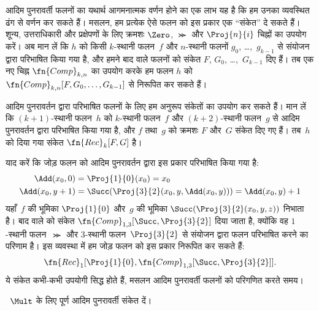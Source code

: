 \documentclass[../../../include/open-logic-section]{subfiles}
\begin{document}

आदिम पुनरावर्ती फलनों का यथार्थ आगमनात्मक वर्णन होने का एक लाभ यह है कि
हम उनका व्यवस्थित ढंग से वर्णन कर सकते हैं। मसलन, हम प्रत्येक ऐसे फलन को
इस प्रकार एक ``संकेत'' दे सकते हैं। शून्य, उत्तराधिकारी और प्रक्षेपणों के
लिए क्रमशः $\Zero$, $\Succ$ और $\Proj{n}{i}$ चिह्नों का उपयोग करें। अब
मान लें कि $h$ को किसी $k$-स्थानी फलन~$f$ और $n$-स्थानी फलनों $g_0$,
\dots,~$g_{k-1}$ से संयोजन द्वारा परिभाषित किया गया है, और हमने बाद वाले
फलनों को संकेत $F$, $G_0$, \dots,~$G_{k-1}$ दिए हैं। तब एक नए चिह्न
$\fn{Comp}_{k,n}$ का उपयोग करके हम फलन $h$ को
$\fn{Comp}_{k,n}[F,G_0,\dots,G_{k-1}]$ से निरूपित कर सकते हैं।

आदिम पुनरावर्तन द्वारा परिभाषित फलनों के लिए हम अनुरूप संकेतों का उपयोग
कर सकते हैं। मान लें कि $(k+1)$-स्थानी फलन~$h$ को $k$-स्थानी फलन~$f$
और $(k+2)$-स्थानी फलन~$g$ से आदिम पुनरावर्तन द्वारा परिभाषित किया गया
है, और $f$ तथा~$g$ को क्रमशः $F$ और~$G$ संकेत दिए गए हैं। तब~$h$ को
दिया गया संकेत $\fn{Rec}_k[F,G]$ है।

याद करें कि जोड़ फलन को आदिम पुनरावर्तन द्वारा इस प्रकार परिभाषित किया गया है:
\begin{align*}
  \Add(x_0, 0) & = \Proj{1}{0}(x_0) = x_0\\
  \Add(x_0, y+1) & = \Succ(\Proj{3}{2}(x_0, y, \Add(x_0, y))) = \Add(x_0, y) +1
\end{align*}
यहाँ~$f$ की भूमिका $\Proj{1}{0}$ और~$g$ की भूमिका
$\Succ(\Proj{3}{2}(x_0, y, z))$ निभाता है। बाद वाले को संकेत
$\fn{Comp}_{1,3}[\Succ,\Proj{3}{2}]$ दिया जाता है, क्योंकि वह
$1$-स्थानी फलन~$\Succ$ और $3$-स्थानी फलन~$\Proj{3}{2}$ से संयोजन द्वारा
फलन परिभाषित करने का परिणाम है। इस व्यवस्था में हम जोड़ फलन को इस प्रकार
निरूपित कर सकते हैं:
\[
\fn{Rec}_1[\Proj{1}{0},\fn{Comp}_{1,3}[\Succ,\Proj{3}{2}]].
\]
ये संकेत कभी-कभी उपयोगी सिद्ध होते हैं, मसलन आदिम पुनरावर्ती फलनों को
परिगणित करते समय।

\begin{prob}
  ~$\Mult$ के लिए पूर्ण आदिम पुनरावर्ती संकेत दें।
\end{prob}
\end{document}
